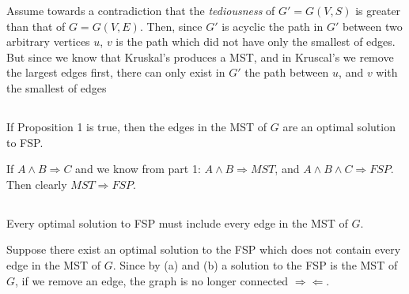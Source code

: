 \documentclass{amsart}
\theoremstyle{definition}
\theoremstyle{remark}
\numberwithin{equation}{section}
\begin{document}
\proof Assume towards a contradiction that the \textit{tediousness} of $G'=G(V,S)$ is greater than
that of $G=G(V,E)$. Then, since $G'$ is acyclic the path in $G'$ between two arbitrary
vertices $u$, $v$ is the path which did not have only the smallest of edges. But since
we know that Kruskal's produces a MST, and in Kruscal's we remove the largest edges first,
there can only exist in $G'$ the path between $u$, and $v$ with the smallest of edges

\subsection{} If Proposition 1 is true, then the edges in the MST of $G$ are an optimal
solution to FSP.

\proof If $A \wedge B \Rightarrow C$ and we know from part 1: $A \wedge B \Rightarrow MST$,
and $A \wedge B \wedge C \Rightarrow FSP$. Then clearly $MST \Rightarrow FSP$.

\subsection{} Every optimal solution to FSP must include every edge in the MST of $G$.

\proof Suppose there exist an optimal solution to the FSP which does not contain
every edge in the MST of $G$. Since by (a) and (b) a solution to the FSP is the
MST of $G$, if we remove an edge, the graph is no longer connected $\Rightarrow \Leftarrow$.
\end{document}
